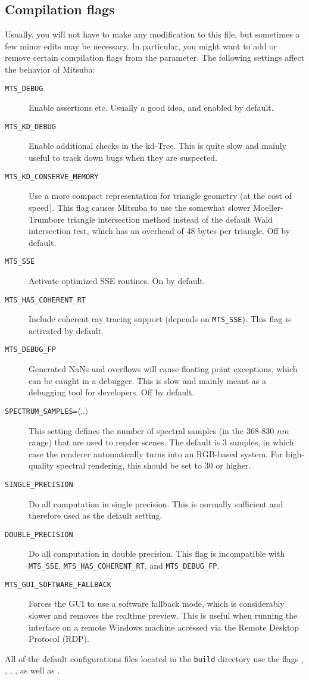 \subsection{Compilation flags}
\label{sec:compiling-flags}
Usually, you will not have to make any modification to this file, but sometimes a few minor 
edits may be necessary. In particular, you might want to add or remove certain
compilation flags from the  parameter. The following settings
affect the behavior of Mitsuba:
\begin{description}
\item[\texttt{MTS\_DEBUG}] Enable assertions etc. Usually a good idea, and
enabled by default.
\item[\texttt{MTS\_KD\_DEBUG}] Enable additional checks in the kd-Tree. This
is quite slow and mainly useful to track down bugs when they are suspected.
\item[\texttt{MTS\_KD\_CONSERVE\_MEMORY}] Use a more compact representation 
for triangle geometry (at the cost of speed). This flag causes Mitsuba to use the somewhat slower
Moeller-Trumbore triangle intersection method instead of the default Wald
intersection test, which has an overhead of 48 bytes per triangle.
Off by default.
\item[\texttt{MTS\_SSE}]Activate optimized SSE routines. On by default.
\item[\texttt{MTS\_HAS\_COHERENT\_RT}]Include coherent ray tracing support (depends on \texttt{MTS\_SSE}). This flag is activated by default. 
\item[\texttt{MTS\_DEBUG\_FP}]Generated NaNs and overflows will cause floating point exceptions, which can be caught in a debugger. This is slow and mainly meant as a debugging tool for developers. Off by default.
\item[\texttt{SPECTRUM\_SAMPLES=}$\langle ..\rangle$]This setting defines the number of spectral samples (in the 368-830 $nm$ range) that are used to render scenes. The default is 3 samples, in which case the renderer automatically turns into an RGB-based system. For high-quality spectral rendering, this should be set to 30 or higher.
\item[\texttt{SINGLE\_PRECISION}] Do all computation in single precision. This is normally sufficient and therefore used as the default setting.
\item[\texttt{DOUBLE\_PRECISION}] Do all computation in double precision. This flag is incompatible with
\texttt{MTS\_SSE}, \texttt{MTS\_HAS\_COHERENT\_RT}, and \texttt{MTS\_DEBUG\_FP}.
\item[\texttt{MTS\_GUI\_SOFTWARE\_FALLBACK}]Forces the GUI to use a software
fallback mode, which is considerably slower and removes the realtime preview.
This is useful when running the interface on a remote Windows machine
accessed via the Remote Desktop Protocol (RDP).
\end{description}
All of the default configurations files located in the \texttt{build} directory use the flags 
, , , ,
as well as .

